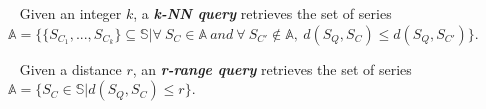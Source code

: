 \vspace*{-0.1cm}
\begin{defn}~\cite{journal/pvldb/echihabi2018} \label{def:knnquery}
Given an integer $k$, a \textit{\textbf{k-NN query}} retrieves the set of series $\mathbb{A} = \{ \{S_{C_1},...,S_{C_k}\} \subseteq \mathbb{S} | \forall \ S_C \in \mathbb{A} \ and \ \forall \ S_{C'} \notin \mathbb{A}, \ d(S_Q,S_C) \leq d(S_Q,S_{C'})\}$.
\end{defn}
\vspace*{-0.3cm}
\begin{defn}~\cite{journal/pvldb/echihabi2018} \label{def:rquery}
Given a distance $r$, an \textit{\textbf{r-range query}} retrieves the set of series $\mathbb{A} = \{S_C \in \mathbb{S} | d(S_Q,S_C) \leq r\}$.
\end{defn}
\vspace*{-0.1cm}



